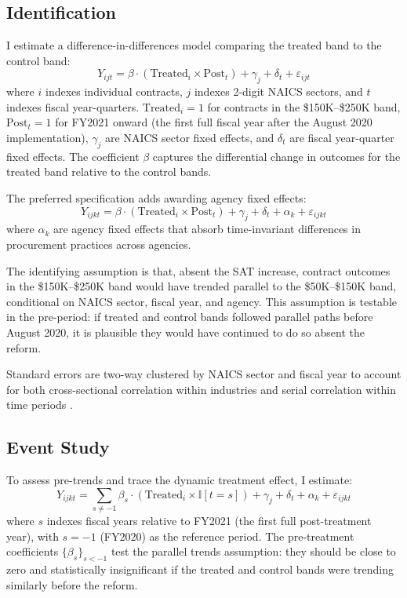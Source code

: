 \documentclass[12pt]{article}
\newcommand{\ind}{\mathbb{I}}
\begin{document}
\subsection{Identification}

I estimate a difference-in-differences model comparing the treated band to the control band:
\begin{equation}
Y_{ijt} = \beta \cdot (\text{Treated}_i \times \text{Post}_t) + \gamma_j + \delta_t + \varepsilon_{ijt}
\label{eq:did}
\end{equation}
where $i$ indexes individual contracts, $j$ indexes 2-digit NAICS sectors, and $t$ indexes fiscal year-quarters. $\text{Treated}_i = 1$ for contracts in the \$150K--\$250K band, $\text{Post}_t = 1$ for FY2021 onward (the first full fiscal year after the August 2020 implementation), $\gamma_j$ are NAICS sector fixed effects, and $\delta_t$ are fiscal year-quarter fixed effects. The coefficient $\beta$ captures the differential change in outcomes for the treated band relative to the control bands.

The preferred specification adds awarding agency fixed effects:
\begin{equation}
Y_{ijkt} = \beta \cdot (\text{Treated}_i \times \text{Post}_t) + \gamma_j + \delta_t + \alpha_k + \varepsilon_{ijkt}
\label{eq:did_full}
\end{equation}
where $\alpha_k$ are agency fixed effects that absorb time-invariant differences in procurement practices across agencies.

The identifying assumption is that, absent the SAT increase, contract outcomes in the \$150K--\$250K band would have trended parallel to the \$50K--\$150K band, conditional on NAICS sector, fiscal year, and agency. This assumption is testable in the pre-period: if treated and control bands followed parallel paths before August 2020, it is plausible they would have continued to do so absent the reform.

Standard errors are two-way clustered by NAICS sector and fiscal year to account for both cross-sectional correlation within industries and serial correlation within time periods \citep{wooldridge2021}.

\subsection{Event Study}

To assess pre-trends and trace the dynamic treatment effect, I estimate:
\begin{equation}
Y_{ijkt} = \sum_{s \neq -1} \beta_s \cdot (\text{Treated}_i \times \ind[t = s]) + \gamma_j + \delta_t + \alpha_k + \varepsilon_{ijkt}
\label{eq:es}
\end{equation}
where $s$ indexes fiscal years relative to FY2021 (the first full post-treatment year), with $s = -1$ (FY2020) as the reference period. The pre-treatment coefficients $\{\beta_s\}_{s < -1}$ test the parallel trends assumption: they should be close to zero and statistically insignificant if the treated and control bands were trending similarly before the reform.
\end{document}
